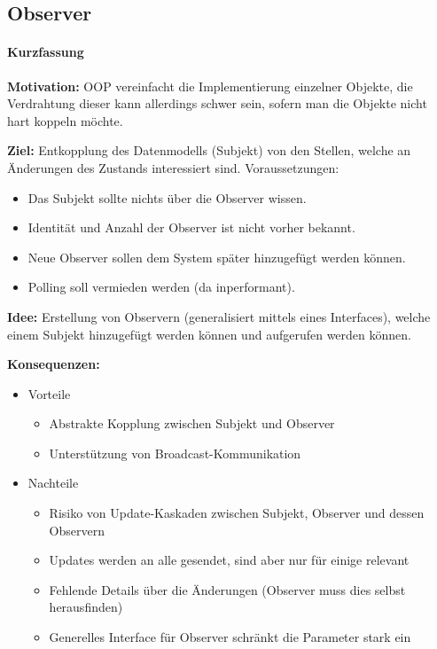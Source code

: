 		\subsection{Observer}
			\paragraph{Kurzfassung}
				\textbf{Motivation:} OOP vereinfacht die Implementierung einzelner Objekte, die Verdrahtung dieser kann allerdings schwer sein, sofern man die Objekte nicht hart koppeln möchte.

				\textbf{Ziel:} Entkopplung des Datenmodells (Subjekt) von den Stellen, welche an Änderungen des Zustands interessiert sind. Voraussetzungen:
				\begin{itemize}
					\item Das Subjekt sollte nichts über die Observer wissen.
					\item Identität und Anzahl der Observer ist nicht vorher bekannt.
					\item Neue Observer sollen dem System später hinzugefügt werden können.
					\item Polling soll vermieden werden (da inperformant).
				\end{itemize}

				\textbf{Idee:} Erstellung von Observern (generalisiert mittels eines Interfaces), welche einem Subjekt hinzugefügt werden können und aufgerufen werden können.

				\textbf{Konsequenzen:}
				\begin{itemize}
					\item Vorteile
						\begin{itemize}
							\item Abstrakte Kopplung zwischen Subjekt und Observer
							\item Unterstützung von Broadcast-Kommunikation
						\end{itemize}
					\item Nachteile
						\begin{itemize}
							\item Risiko von Update-Kaskaden zwischen Subjekt, Observer und dessen Observern
							\item Updates werden an alle gesendet, sind aber nur für einige relevant
							\item Fehlende Details über die Änderungen (Observer muss dies selbst herausfinden)
							\item Generelles Interface für Observer schränkt die Parameter stark ein
						\end{itemize}
				\end{itemize}

